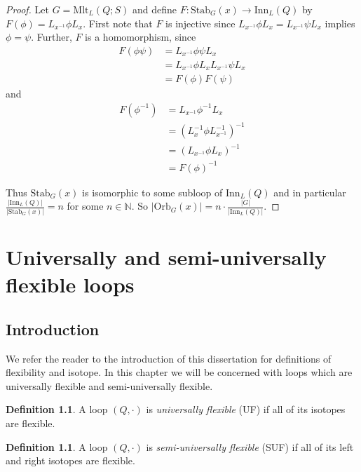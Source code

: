 \documentclass[12pt]{report}
\theoremstyle{definition}
\newtheorem{dfn}[thm]{Definition}
\newcommand{\mlt}{\text{Mlt}}       %
\newcommand{\inn}{\text{Inn}}       %
\newcommand{\stb}{\text{Stab}}		  %
\newcommand{\orb}{\text{Orb}}		    %
\begin{document}
\begin{proof}
Let $G = \mlt_L(Q; S)$ and define $F: \stb_G(x)\to \inn_L(Q)$ by $F(\phi) = L_{x^{-1}}\phi L_x$.
  First note that $F$ is injective since $L_{x^{-1}}\phi L_x = L_{x^{-1}}\psi L_x$ implies
  $\phi = \psi$. Further, $F$ is a homomorphism, since
  \begin{align*}
    F(\phi\psi) &= L_{x^{-1}}\phi\psi L_x\\
    &= L_{x^{-1}}\phi L_x L_{x^{-1}} \psi L_x\\
    &= F(\phi)F(\psi)
  \end{align*}
and
  \begin{align*}
    F(\phi^{-1}) &= L_{x^{-1}}\phi^{-1}L_x\\
    &= (L_x^{-1}\phi L_{x^{-1}}^{-1})^{-1}\\
    &= (L_{x^{-1}}\phi L_x)^{-1}\\
    &= F(\phi)^{-1}
  \end{align*}

Thus $\stb_G(x)$ is isomorphic to some subloop of $\inn_L(Q)$ and in particular
  $\frac{|\inn_L(Q)|}{|\stb_G(x)|} = n$ for some $n\in \mathbb{N}$. So
  $|\orb_G(x)| = n\cdot \frac{|G|}{|\inn_L(Q)|}$.
\end{proof}


\chapter{Universally and semi-universally flexible loops}

\section{Introduction}

We refer the reader to the introduction of this dissertation for definitions of flexibility and
  isotope. In this chapter we will be concerned with loops which are universally flexible
  and semi-universally flexible.

\begin{dfn}
  A loop $(Q, \cdot)$ is \emph{universally flexible} (UF) if all of its isotopes are flexible.
\end{dfn}

\begin{dfn}
  A loop $(Q, \cdot)$ is \emph{semi-universally flexible} (SUF) if all of its left and
    right isotopes are flexible.
\end{dfn}
\end{document}
